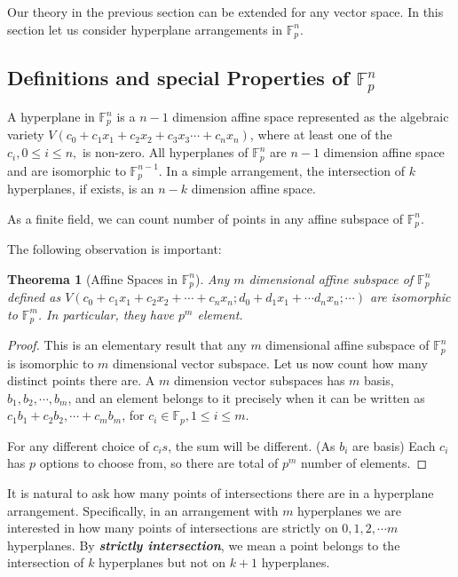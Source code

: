 \documentclass[12pt, a4paper]{article}
\newtheorem{theorem}{Theorema}[subsection]
\theoremstyle{definition}
\theoremstyle{remark}
\renewcommand{\emph}[1]{\textit{\textbf{#1}}}
\begin{document}
Our theory in the previous section can be extended for any vector space. 
In this section let us consider hyperplane arrangements in $\mathbb{F}_p^n$.


\subsection{Definitions and special Properties of $\mathbb{F}_p^n$}

A hyperplane in $\mathbb{F}_p^n$ is a $n-1$ dimension affine space represented as the algebraic variety $V(c_0 + c_1x_1 + c_2x_2 + c_3x_3 \cdots + c_nx_n)$, where at least one of the $c_i, 0 \leq i \leq n,$ is non-zero. 
All hyperplanes of $\mathbb{F}_p^n$ are $n-1$ dimension affine space and are isomorphic to $\mathbb{F}_p^{n-1}$. 
In a simple arrangement, the intersection of $k$ hyperplanes, if exists, is an $n-k$ dimension affine space.

As a finite field, we can count number of points in any affine subspace of $\mathbb{F}_p^n$. 

The following observation is important:

\begin{theorem}[Affine Spaces in $\mathbb{F}_p^n$]
	\label{th:f_p affine space}
	Any $m$ dimensional affine subspace of $\mathbb{F}_p^n$ defined as $V(c_0 + c_1x_1+c_2x_2 + \cdots + c_nx_n; d_0 + d_1x_1 + \cdots d_nx_n; \cdots)$ are isomorphic to $\mathbb{F}_p^m$. In particular, they have $p^m$ element.
\end{theorem}

\begin{proof}
	This is an elementary result that any $m$ dimensional affine subspace of $\mathbb{F}_p^n$ is isomorphic to $m$ dimensional vector subspace. Let us now count how many distinct points there are.
	A $m$ dimension vector subspaces has $m$ basis, $b_1, b_2, \cdots, b_m$, and an element belongs to it precisely when it can be written as
		$ c_1b_1 + c_2b_2, \cdots + c_m b_m $,
	for $c_i \in \mathbb{F}_p, 1\leq i \leq m $.

	For any different choice of $c_i s$, the sum will be different. (As $b_i$ are basis) Each $c_i$ has $p$ options to choose from, so there are total of $p^m$ number of elements.
\end{proof}

It is natural to ask how many points of intersections there are in a hyperplane arrangement. 
Specifically, in an arrangement with $m$ hyperplanes we are interested in how many points of intersections are strictly on $0, 1, 2, \cdots m$ hyperplanes. 
By \emph{strictly intersection}, we mean a point belongs to the intersection of $k$ hyperplanes but not on $k+1$ hyperplanes. 
\end{document}
